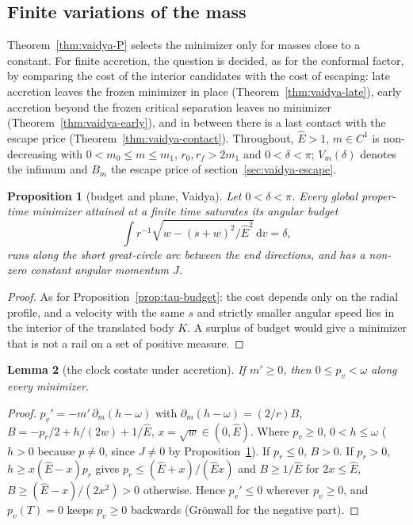 \documentclass[aip,jmp,amsmath,amssymb,reprint]{revtex4-2}
\newcommand{\Ehat}{\hat E}
\newcommand{\dd}{\mathrm{d}}
\theoremstyle{plain}
\newtheorem{proposition}{Proposition}[section]
\newtheorem{lemma}[proposition]{Lemma}
\theoremstyle{definition}
\begin{document}
\subsection{Finite variations of the mass}
\label{sec:vaidya-var}
Theorem~\ref{thm:vaidya-P} selects the minimizer only for masses close to a constant. For finite
accretion, the question is decided, as for the conformal factor, by comparing the cost of the interior
candidates with the cost of escaping: late accretion leaves the frozen minimizer in place
(Theorem~\ref{thm:vaidya-late}), early accretion beyond the frozen critical separation leaves no
minimizer (Theorem~\ref{thm:vaidya-early}), and in between there is a last contact with the escape price
(Theorem~\ref{thm:vaidya-contact}). Throughout, $\Ehat>1$, $m\in C^1$ is non-decreasing with
$0<m_0\le m\le m_1$, $r_0,r_f>2m_1$ and $0<\delta<\pi$; $V_m(\delta)$ denotes the infimum and $B_m$ the escape price of
section~\ref{sec:vaidya-escape}.

\begin{proposition}[budget and plane, Vaidya]\label{prop:vaidya-budget}
Let $0<\delta<\pi$. Every global proper-time minimizer attained at a finite time saturates its angular budget
\[
  \int r^{-1}\sqrt{w-(s+w)^2/\Ehat^2}\,\dd v=\delta,
\]
runs along the short great-circle arc between the end
directions, and has a non-zero constant angular momentum $J$.
\end{proposition}

\begin{proof}
As for Proposition~\ref{prop:tau-budget}: the cost depends only on the radial profile, and a velocity with the
same $s$ and strictly smaller angular speed lies in the interior of the translated body $K$. A surplus of
budget would give a minimizer that is not a rail on a set of positive measure.
\end{proof}

\begin{lemma}[the clock costate under accretion]\label{lem:vaidya-q}
If $m'\ge0$, then $0\le p_v<\omega$ along every minimizer.
\end{lemma}

\begin{proof}
$p_v'=-m'\,\partial_m(h-\omega)$ with $\partial_m(h-\omega)=(2/r)B$, $B=-p_r/2+h/(2w)+1/\Ehat$, $x=\sqrt w\in(0,\Ehat)$.
Where $p_v\ge0$, $0<h\le\omega$ ($h>0$ because $p\ne0$, since $J\ne0$ by Proposition~\ref{prop:vaidya-budget}). If $p_r\le0$, $B>0$. If $p_r>0$, $h\ge x(\Ehat-x)p_r$ gives
$p_r\le(\Ehat+x)/(\Ehat x)$ and $B\ge1/\Ehat$ for $2x\le\Ehat$, $B\ge(\Ehat-x)/(2x^2)>0$ otherwise. Hence $p_v'\le0$
wherever $p_v\ge0$, and $p_v(T)=0$ keeps $p_v\ge0$ backwards (Gr\"onwall for the negative part).
\end{proof}
\end{document}
